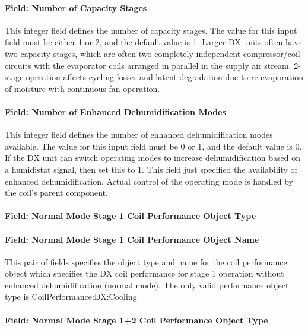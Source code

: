 \paragraph{Field: Number of Capacity Stages}\label{field-number-of-capacity-stages}

This integer field defines the number of capacity stages. The value for this input field must be either 1 or 2, and the default value is 1. Larger DX units often have two capacity stages, which are often two completely independent compressor/coil circuits with the evaporator coils arranged in parallel in the supply air stream. 2-stage operation affects cycling losses and latent degradation due to re-evaporation of moisture with continuous fan operation.

\paragraph{Field: Number of Enhanced Dehumidification Modes}\label{field-number-of-enhanced-dehumidification-modes}

This integer field defines the number of enhanced dehumidification modes available. The value for this input field must be 0 or 1, and the default value is 0. If the DX unit can switch operating modes to increase dehumidification based on a humidistat signal, then set this to 1. This field just specified the availability of enhanced dehumidification. Actual control of the operating mode is handled by the coil's parent component.

\paragraph{Field: Normal Mode Stage 1 Coil Performance Object Type}\label{field-normal-mode-stage-1-coil-performance-object-type}

\paragraph{Field: Normal Mode Stage 1 Coil Performance Object Name}\label{field-normal-mode-stage-1-coil-performance-object-name}

This pair of fields specifies the object type and name for the coil performance object which specifies the DX coil performance for stage 1 operation without enhanced dehumidification (normal mode). The only valid performance object type is CoilPerformance:DX:Cooling.

\paragraph{Field: Normal Mode Stage 1+2 Coil Performance Object Type}\label{field-normal-mode-stage-12-coil-performance-object-type}

